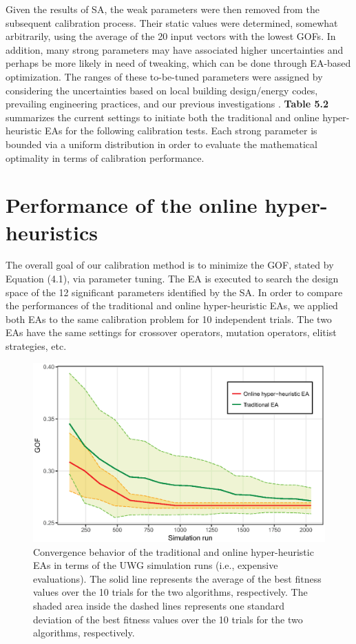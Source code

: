 Given the results of SA, the weak parameters were then removed from the subsequent calibration process. Their static values were determined, somewhat arbitrarily, using the average of the 20 input vectors with the lowest GOFs. In addition, many strong parameters may have associated higher uncertainties and perhaps be more likely in need of tweaking, which can be done through EA-based optimization. The ranges of these to-be-tuned parameters were assigned by considering the uncertainties based on local building design/energy codes, prevailing engineering practices, and our previous investigations \cite{bueno2013urban,bueno2014computationally,nakano2015urban,yang2016curious}. \textbf{Table 5.2} summarizes the current settings to initiate both the traditional and online hyper-heuristic EAs for the following calibration tests. Each strong parameter is bounded via a uniform distribution in order to evaluate the mathematical optimality in terms of calibration performance.

\section{Performance of the online hyper-heuristics}

The overall goal of our calibration method is to minimize the GOF, stated by Equation (4.1), via parameter tuning. The EA is executed to search the design space of the 12 significant parameters identified by the SA. In order to compare the performances of the traditional and online hyper-heuristic EAs, we applied both EAs to the same calibration problem for 10 independent trials. The two EAs have the same settings for crossover operators, mutation operators, elitist strategies, etc.

\begin{figure}[]
\centering
\includegraphics[width=.7\linewidth]{Figure5-4.eps}
\caption{Convergence behavior of the traditional and online hyper-heuristic EAs in terms of the UWG simulation runs (i.e., expensive evaluations). The solid line represents the average of the best fitness values over the 10 trials for the two algorithms, respectively. The shaded area inside the dashed lines represents one standard deviation of the best fitness values over the 10 trials for the two algorithms, respectively.}
\end{figure}


